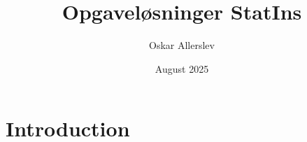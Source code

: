 \documentclass{article}
\title{Opgaveløsninger StatIns}
\author{Oskar Allerslev}
\date{August 2025}
\begin{document}
\maketitle

\section{Introduction}
\end{document}
